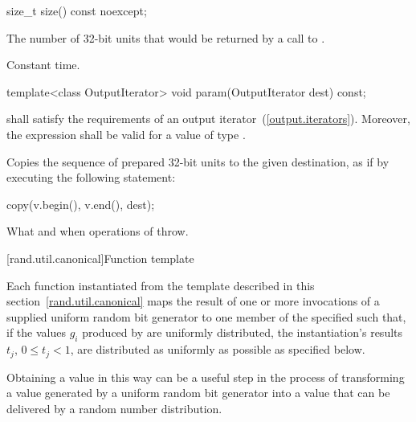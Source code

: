 %
\begin{itemdecl}
size_t size() const noexcept;
\end{itemdecl}

\begin{itemdescr}
\pnum\returns The number of 32-bit units
 that would be returned
 by a call to .

\pnum\complexity Constant time.
\end{itemdescr}

%
\begin{itemdecl}
template<class OutputIterator>
  void param(OutputIterator dest) const;
\end{itemdecl}

\begin{itemdescr}
\pnum\requires
   shall satisfy the requirements
  of an output iterator~(\ref{output.iterators}).
  Moreover,
  the expression
  shall be valid for a value  of type .

\pnum\effects Copies the sequence of prepared 32-bit units
 to the given destination,
 as if by executing the following statement:
\begin{codeblock}
copy(v.begin(), v.end(), dest);
\end{codeblock}

\pnum\throws
What and when  operations of  throw.
\end{itemdescr}


[rand.util.canonical]{Function template }%
%

\pnum
 Each function instantiated
 from the template
 described in this section~\ref{rand.util.canonical}
 maps the result of one or more invocations
 of a supplied uniform random bit generator 
 to one member
 of the specified 
 such that,
 if the values $g_i$
 produced by 
 are uniformly distributed,
 the instantiation's results
 $t_j$, $ 0 \leq t_j < 1 $,
 are distributed as uniformly as possible
 as specified below.

\pnum
\begin{note}
 Obtaining a value in this way
 can be a useful step
 in the process of transforming
 a value generated by a uniform random bit generator
 into a value
 that can be delivered by a random number distribution.
\end{note}

